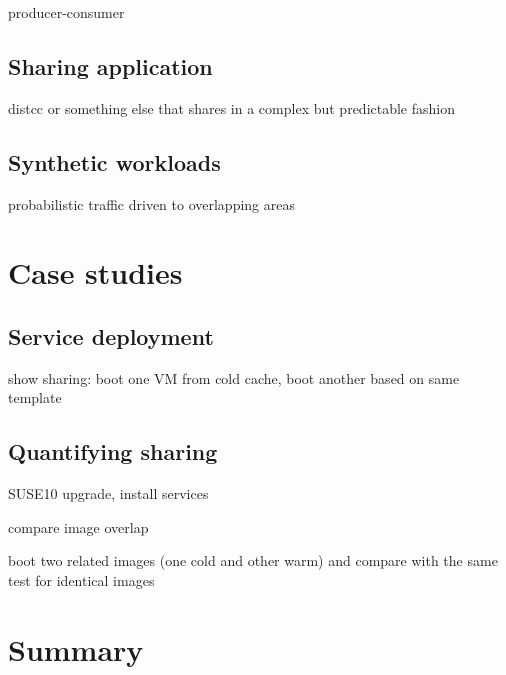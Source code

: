 producer-consumer

\subsection{Sharing application}
distcc or something else that shares in a complex but predictable fashion

\subsection{Synthetic workloads}

probabilistic traffic driven to overlapping areas

\section{Case studies}

\subsection{Service deployment}
show sharing: boot one VM from cold cache, boot another based on same template

\subsection{Quantifying sharing}

SUSE10 upgrade, install services

compare image overlap

boot two related images (one cold and other warm) and compare with the same test for identical images

\section{Summary}
